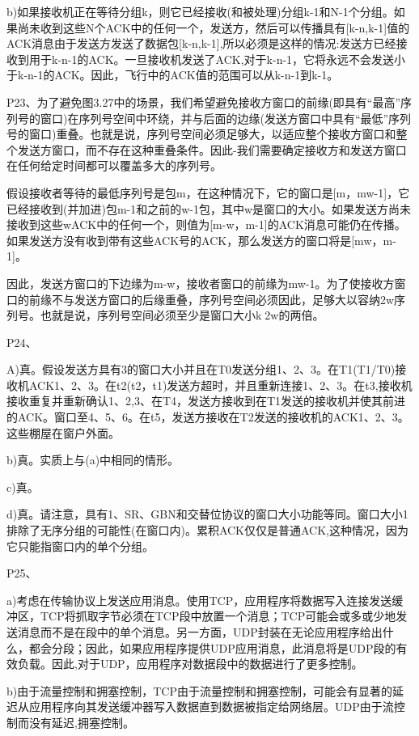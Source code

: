 \documentclass[11pt,UTF8,twoside]{article}
\begin{document}
	b)如果接收机正在等待分组k，则它已经接收(和被处理)分组k-1和N-1个分组。如果尚未收到这些N个ACK中的任何一个，发送方，然后可以传播具有[k-n,k-1]值的ACK消息由于发送方发送了数据包[k-n,k-1],所以必须是这样的情况:发送方已经接收到用于k-n-1的ACK。一旦接收机发送了ACK,对于k-n-1，它将永远不会发送小于k-n-1的ACK。因此，飞行中的ACK值的范围可以从k-n-1到k-1。
	
	P23、为了避免图3.27中的场景，我们希望避免接收方窗口的前缘(即具有“最高”序列号的窗口)在序列号空间中环绕，并与后面的边缘(发送方窗口中具有“最低”序列号的窗口)重叠。也就是说，序列号空间必须足够大，以适应整个接收方窗口和整个发送方窗口，而不存在这种重叠条件。因此-我们需要确定接收方和发送方窗口在任何给定时间都可以覆盖多大的序列号。
	
	假设接收者等待的最低序列号是包m，在这种情况下，它的窗口是[m，mw-1]，它已经接收到(并加进)包m-1和之前的w-1包，其中w是窗口的大小。如果发送方尚未接收到这些wACK中的任何一个，则值为[m-w，m-1]的ACK消息可能仍在传播。如果发送方没有收到带有这些ACK号的ACK，那么发送方的窗口将是[mw，m-1]。
	
	因此，发送方窗口的下边缘为m-w，接收者窗口的前缘为mw-1。为了使接收方窗口的前缘不与发送方窗口的后缘重叠，序列号空间必须因此，足够大以容纳2w序列号。也就是说，序列号空间必须至少是窗口大小k2w的两倍。
	
	P24、
	
	A)真。假设发送方具有3的窗口大小并且在T0发送分组1、2、3。在T1(T1/T0)接收机ACK1、2、3。在t2(t2，t1)发送方超时，并且重新连接1、2、3。在t3,接收机接收重复并重新确认1、2,3、在T4，发送方接收到在T1发送的接收机并使其前进的ACK。窗口至4、5、6。在t5，发送方接收在T2发送的接收机的ACK1、2、3。这些棚屋在窗户外面。
	
	b)真。实质上与(a)中相同的情形。
	
	c)真。
	
	d)真。请注意，具有1、SR、GBN和交替位协议的窗口大小功能等同。窗口大小1排除了无序分组的可能性(在窗口内)。累积ACK仅仅是普通ACK,这种情况，因为它只能指窗口内的单个分组。
	
	P25、
	
	a)考虑在传输协议上发送应用消息。使用TCP，应用程序将数据写入连接发送缓冲区，TCP将抓取字节必须在TCP段中放置一个消息；TCP可能会或多或少地发送消息而不是在段中的单个消息。另一方面，UDP封装在无论应用程序给出什么，都会分段；因此，如果应用程序提供UDP应用消息，此消息将是UDP段的有效负载。因此,对于UDP，应用程序对数据段中的数据进行了更多控制。
	
	b)由于流量控制和拥塞控制，TCP由于流量控制和拥塞控制，可能会有显著的延迟从应用程序向其发送缓冲器写入数据直到数据被指定给网络层。UDP由于流控制而没有延迟,拥塞控制。
	
\end{document}
